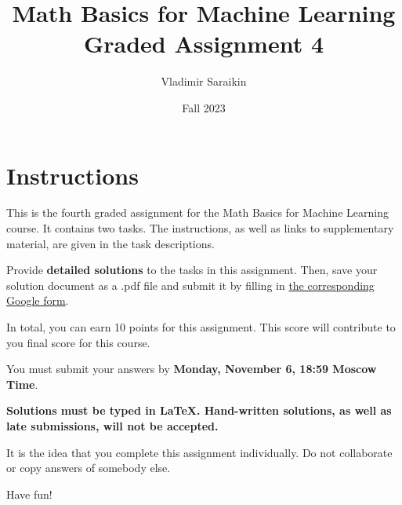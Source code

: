 \documentclass{exam}
\title{Math Basics for Machine Learning \\ 
Graded Assignment 4}
\author{Vladimir Saraikin}
\date{Fall 2023}
\begin{document}
\maketitle

\section*{Instructions}

This is the fourth graded assignment for the Math Basics for Machine Learning course. It contains two tasks. The instructions, as well as links to supplementary material, are given in the task descriptions. 

\vspace{0.25cm}
\noindent
Provide \textbf{detailed solutions} to the tasks in this assignment. Then, save your solution document as a .pdf file and submit it by filling in \href{https://forms.gle/ndYhtvi5JvGiALsv7}{the corresponding Google form}.

\vspace{0.25cm}
\noindent
In total, you can earn 10 points for this assignment. This score will contribute to you final score for this course.

\vspace{0.25cm}
\noindent
You must submit your answers by 
\textbf{Monday, November 6, 18:59 Moscow Time}. 

\vspace{0.25cm}
\noindent
\textbf{Solutions must be typed in LaTeX. Hand-written solutions, as well as late submissions, will not be accepted.}

\vspace{0.25cm}
\noindent
It is the idea that you complete this assignment individually. Do not collaborate or copy answers of somebody else.

\vspace{0.25cm}
\noindent
Have fun!

\newpage
\end{document}
